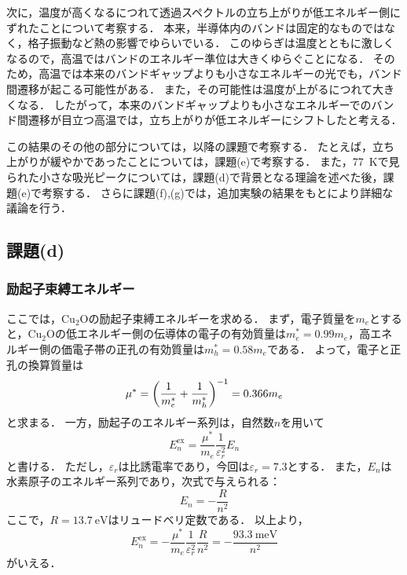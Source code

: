 \documentclass[titlepage]{jsarticle}
\begin{document}
次に，温度が高くなるにつれて透過スペクトルの立ち上がりが低エネルギー側にずれたことについて考察する．
本来，半導体内のバンドは固定的なものではなく，格子振動など熱の影響でゆらいでいる．
このゆらぎは温度とともに激しくなるので，高温ではバンドのエネルギー準位は大きくゆらぐことになる．
そのため，高温では本来のバンドギャップよりも小さなエネルギーの光でも，バンド間遷移が起こる可能性がある．
また，その可能性は温度が上がるにつれて大きくなる．
したがって，本来のバンドギャップよりも小さなエネルギーでのバンド間遷移が目立つ高温では，立ち上がりが低エネルギーにシフトしたと考える．

この結果のその他の部分については，以降の課題で考察する．
たとえば，立ち上がりが緩やかであったことについては，課題(e)で考察する．
また，\SI{77}{\kelvin}で見られた小さな吸光ピークについては，課題(d)で背景となる理論を述べた後，課題(e)で考察する．
さらに課題(f),(g)では，追加実験の結果をもとにより詳細な議論を行う．

\subsection{課題(d)}
\subsubsection{励起子束縛エネルギー}
ここでは，Cu$_2$Oの励起子束縛エネルギーを求める．
まず，電子質量を$m_e$とすると，Cu$_2$Oの低エネルギー側の伝導体の電子の有効質量は$m^*_e = 0.99m_e$，高エネルギー側の価電子帯の正孔の有効質量は$m^*_h = 0.58m_e$である．
よって，電子と正孔の換算質量は
\begin{equation}
  \mu^* = \qty(\frac{1}{m^*_e} + \frac{1}{m^*_h})^{-1} = 0.366 m_e
\end{equation}
と求まる．
一方，励起子のエネルギー系列は，自然数$n$を用いて
\begin{equation}
  E_n^{\mathrm{ex}} = \frac{\mu^*}{m_e}\frac{1}{\varepsilon_r^2} E_n
\end{equation}
と書ける．
ただし，$\varepsilon_r$は比誘電率であり，今回は$\varepsilon_r=7.3$とする．
また，$E_n$は水素原子のエネルギー系列であり，次式で与えられる：
\begin{equation}
  E_n = -\frac{R}{n^2}
\end{equation}
ここで，$R=\SI{13.7}{\eV}$はリュードベリ定数である．
以上より，
\begin{equation}
  E_n^{\mathrm{ex}} = -\frac{\mu^*}{m_e}\frac{1}{\varepsilon_r^2} \frac{R}{n^2} = -\frac{\SI{93.3}{\meV}}{n^2}
\end{equation}
がいえる．
\end{document}
